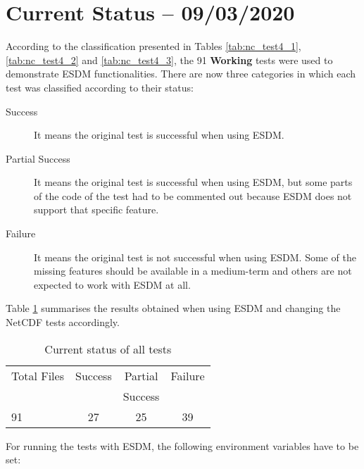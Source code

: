 \section{Current Status -- 09/03/2020}

According to the classification presented in Tables \ref{tab:nc_test4_1}, \ref{tab:nc_test4_2} and \ref{tab:nc_test4_3}, the 91 {\bf Working} tests were used to demonstrate ESDM functionalities.
There are now three categories in which each test was classified according to their status:

\begin{description}

\item[Success] It means the original test is successful when using ESDM.

\item[Partial Success] It means the original test is successful when using ESDM, but some parts of the code of the test had to be commented out because ESDM does not support that specific feature.

\item[Failure] It means the original test is not successful when using ESDM.
Some of the missing features should be available in a medium-term and others are not expected to work with ESDM at all.

\end{description}

Table \ref{tab:nc_test4_status_3} summarises the results obtained when using ESDM and changing the NetCDF tests accordingly.

\begin{table}[H]
\centering
\begin{tabular}{|l|c|c|c|}
\hline
\multicolumn{1}{|c|}{Total Files} & \multicolumn{1}{c|}{Success} & \multicolumn{1}{c|}{Partial} & \multicolumn{1}{c|}{Failure} \\
                                  &                              & \multicolumn{1}{c|}{Success} &               \\ \hline \hline
91                                &     27                       &       25                     &       39      \\ \hline \hline
\end{tabular}
\caption{\label{tab:nc_test4_status_3} Current status of all tests}
\end{table}

For running the tests with ESDM, the following environment variables have to be set:

